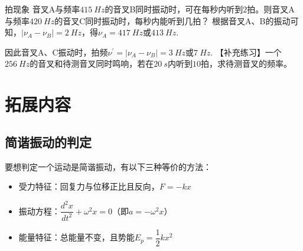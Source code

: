 \begin{example}{拍现象}
    音叉A与频率$\SI{415}{Hz}$的音叉B同时振动时，可在每秒内听到$2$拍。则音叉A与频率$\SI{420}{Hz}$的音叉C同时振动时，每秒内能听到几拍？
    \tcbline
    根据音叉A、B的振动可知，$|\nu_A-\nu_B|=\SI{2}{Hz}$，得$\nu_A=\SI{417}{Hz}$或$\SI{413}{Hz}$.

    因此音叉A、C振动时，拍频$\nu^\prime=|\nu_A-\nu_B|=\SI{3}{Hz}$或$\SI{7}{Hz}$.
    \tcbline
    【补充练习】一个$\SI{256}{Hz}$的音叉和待测音叉同时鸣响，若在$\SI{20}{s}$内听到$10$拍，求待测音叉的频率。
\end{example}

\section{拓展内容}

\subsection{简谐振动的判定}

要想判定一个运动是简谐振动，有以下三种等价的方法：
\begin{itemize}
    \item 受力特征：回复力与位移正比且反向，$F=-kx$
    \item 振动方程：$\dfrac{d^2x}{dt^2}+\omega^2x=0$（即$a=-\omega^2 x$）
    \item 能量特征：总能量不变，且势能$E_p=\dfrac{1}{2}kx^2$
\end{itemize}

